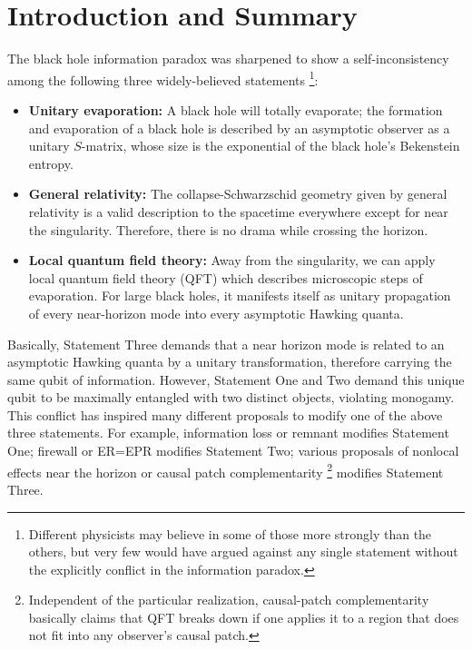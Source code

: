 \documentclass[aps,showpacs,twocolumn,floats,prd,superscriptaddress,nofootinbib]{revtex4-1}
\begin{document}
\maketitle


\onecolumngrid

\section{Introduction and Summary}

The black hole information paradox \cite{Haw76a} was sharpened to show a self-inconsistency among the following three widely-believed statements \cite{AMPS}
\footnote{Different physicists may believe in some of those more strongly than the others, but very few would have argued against any single statement without the explicitly conflict in the information paradox.}:
\begin{itemize}
\item {\bf Unitary evaporation:} A black hole will totally evaporate; the formation and evaporation of a black hole is described by an asymptotic observer as a unitary $S$-matrix, whose size is the exponential of the black hole's Bekenstein entropy.
\item {\bf General relativity:} The collapse-Schwarzschid geometry given by general relativity is a valid description to the spacetime everywhere except for near the singularity.
Therefore, there is no drama while crossing the horizon.
\item {\bf Local quantum field theory:} Away from the singularity, we can apply local quantum field theory (QFT) which describes microscopic steps of evaporation. 
For large black holes, it manifests itself as unitary propagation of every near-horizon mode into every asymptotic Hawking quanta.
\end{itemize}
Basically, Statement Three demands that a near horizon mode is related to an asymptotic Hawking quanta by a unitary transformation, therefore carrying the same qubit of information. 
However, Statement One and Two demand this unique qubit to be maximally entangled with two distinct objects, violating monogamy. 
This conflict has inspired many different proposals to modify one of the above three statements. 
For example, information loss or remnant \cite{Bek94} modifies Statement One; 
firewall \cite{BraPir09,AMPS} or ER=EPR \cite{MalSus13} modifies Statement Two;
various proposals of nonlocal effects near the horizon \cite{Gid12,DodSil15,OsuPag16} or causal patch complementarity \cite{HuiYan13,IlgYan13,LowTho14}
\footnote{Independent of the particular realization, causal-patch complementarity basically claims that QFT breaks down if one applies it to a region that does not fit into any observer's causal patch.} 
modifies Statement Three.
\end{document}
